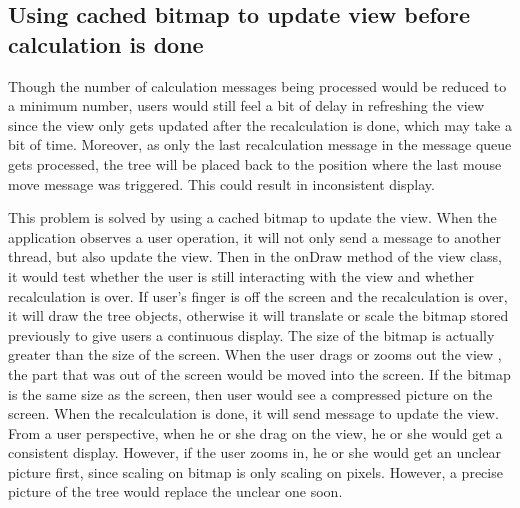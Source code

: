 \documentclass[MSc]{icldt}
\begin{document}
\subsection{Using cached bitmap to update view before calculation is done}
 
 Though the number of calculation messages being processed would be reduced to a minimum number, users would still feel a bit of delay in refreshing the view since the view only gets updated after the recalculation is done, which may take a bit of time. Moreover, as only the last recalculation message in the message queue gets processed, the tree will be placed back to the position where the last mouse move message was triggered. This could result in inconsistent display. 
 
This problem is solved by using a cached bitmap to update the view. When the application observes a user operation, it will not only send a message to another thread, but also update the view. Then in the onDraw method of the view class, it would test whether the user is still interacting with the view and whether recalculation is over. If user's finger is off the screen and the recalculation is over, it will draw the tree objects, otherwise it will translate or scale the bitmap stored previously to give users a continuous display. The size of the bitmap is actually greater than the size of the screen. When the user drags or zooms out the view , the part that was out of the screen would be moved into the screen. If the bitmap is the same size as the screen, then user would see a compressed picture on the screen. 
When the recalculation is done, it will send message to update the view. From a user perspective, when he or she drag on the view, he or she would get a consistent display. However, if the user zooms in, he or she would get an unclear picture first, since scaling on bitmap is only scaling on pixels. However, a precise picture of the tree would replace the unclear one soon. 
\end{document}
